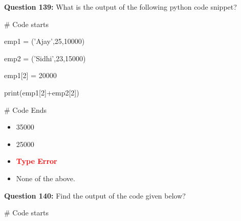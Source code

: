 \documentclass[12pt,a4paper]{article}
\begin{document}
\vspace{0.5cm}

\textbf{Question 139:} What is the output of the following python code snippet?\newline

\newline
\newline

\newline
# Code starts\newline

\newline
emp1 = ('Ajay',25,10000)\newline

\newline
emp2 = ('Sidhi',23,15000)\newline

\newline
\newline

\newline
emp1[2] = 20000\newline

\newline
\newline

\newline
print(emp1[2]+emp2[2])\newline

\newline
# Code Ends

\begin{itemize}
    \item[\textbf{A.}] 35000
    \item[\textbf{B.}] 25000
    \item[\textbf{C.}] \textcolor{red}{\textbf{Type Error}}
    \item[\textbf{D.}] None of the above.
\end{itemize}

\vspace{0.5cm}

\textbf{Question 140:} Find the output of the code given below?\newline

\newline
\newline

\newline
# Code starts\newline

\newline
\newline
\end{document}
